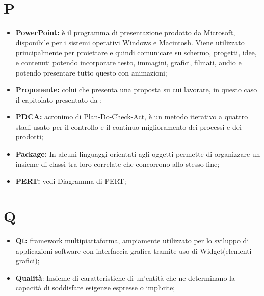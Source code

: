 %


\section*{P} %
\label{sec:p}
	\begin{itemize}
		\item \textbf{PowerPoint:} è il programma di presentazione prodotto da Microsoft, disponibile per i sistemi operativi Windows e Macintosh. Viene utilizzato principalmente per proiettare e quindi comunicare su schermo, progetti, idee, e contenuti potendo incorporare testo, immagini, grafici, filmati, audio e potendo presentare tutto questo con animazioni;
		\item \textbf{Proponente:} colui che presenta una proposta su cui lavorare, in questo caso il capitolato presentato da \proposerName;
		\item \textbf{PDCA:} acronimo di Plan-Do-Check-Act, è un metodo iterativo a quattro stadi usato per il controllo e il continuo miglioramento dei processi e dei prodotti;
		\item \textbf{Package:} In alcuni linguaggi orientati agli oggetti permette di organizzare un insieme di classi tra loro correlate che concorrono allo stesso fine;
		\item \textbf{PERT:} vedi Diagramma di PERT;
	\end{itemize}
\pagebreak

\section*{Q} %
\label{sec:q}
	\begin{itemize}
		\item \textbf{Qt:} framework multipiattaforma, ampiamente utilizzato per lo sviluppo di applicazioni software con interfaccia grafica tramite uso di Widget(elementi grafici);
		\item \textbf{Qualità}: Insieme di caratteristiche di un'entità che ne determinano la capacità di soddisfare esigenze espresse o implicite;	
	\end{itemize}
\pagebreak

